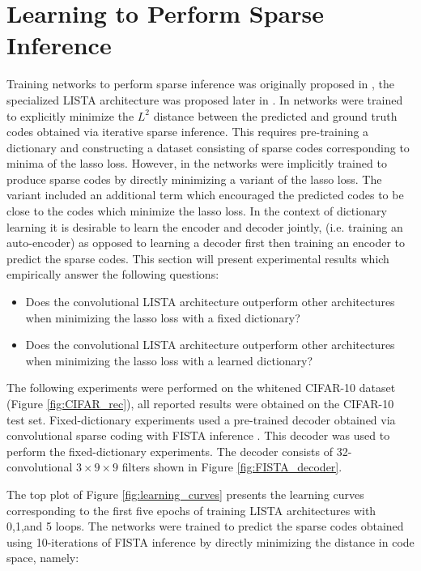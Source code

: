 \section{Learning to Perform Sparse Inference} Training networks to perform
sparse inference was originally proposed in \cite{groupSparsity}, the
specialized LISTA architecture was proposed later in \cite{LISTA}. 
In \cite{LISTA} networks were trained to explicitly minimize the $L^2$ distance
between the predicted and ground truth codes obtained via iterative sparse
inference. This requires pre-training a dictionary and constructing a dataset
consisting of sparse codes corresponding to minima of the lasso loss.  However,
in \cite{groupSparsity} the networks were implicitly trained to produce sparse
codes by directly minimizing a variant of the lasso loss. The variant included
an additional term which encouraged the predicted codes to be close to the
codes which minimize the lasso loss.  In the context of dictionary learning it
is desirable to learn the encoder and decoder jointly, (i.e. training an
auto-encoder) as opposed to learning a decoder first then training an encoder
to predict the sparse codes. This section will present experimental results
which empirically answer the following questions: \begin{itemize} \item{Does
the convolutional LISTA architecture outperform other architectures when
minimizing the lasso loss with a fixed dictionary?} \item{Does the
convolutional LISTA architecture outperform other architectures when minimizing
the lasso loss with a learned dictionary?} \end{itemize} The following
experiments were performed on the whitened CIFAR-10 dataset (Figure
\ref{fig:CIFAR_rec}), all reported results were obtained on the CIFAR-10 test
set. Fixed-dictionary experiments used a pre-trained decoder obtained via
convolutional sparse coding with FISTA inference \cite{ConvSC}.  This decoder
was used to perform the fixed-dictionary experiments. The decoder consists of
32-convolutional $3\times9\times9$ filters shown in Figure
\ref{fig:FISTA_decoder}. 

The top plot of Figure \ref{fig:learning_curves} presents the learning curves
corresponding to the first five epochs of training LISTA architectures with
0,1,and 5 loops. The networks were trained to predict the sparse codes obtained
using 10-iterations of FISTA inference by directly minimizing the distance in
code space, namely:

